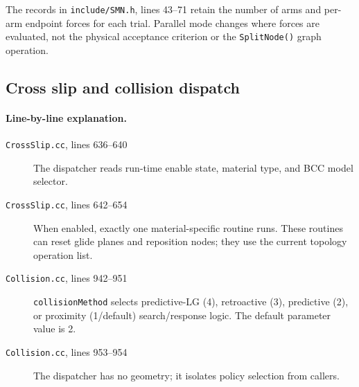 \documentclass[11pt]{article}
\newcommand{\code}[1]{\texorpdfstring{\nolinkurl{#1}}{#1}}
\newcommand{\srcfile}[1]{\texorpdfstring{\nolinkurl{#1}}{#1}}
\begin{document}
The records in \srcfile{include/SMN.h}, lines 43--71 retain the number of
arms and per-arm endpoint forces for each trial. Parallel mode changes where
forces are evaluated, not the physical acceptance criterion or the
\code{SplitNode()} graph operation.

\subsection{Cross slip and collision dispatch}





\paragraph{Line-by-line explanation.}
\begin{description}
\item[\srcfile{CrossSlip.cc}, lines 636--640] The dispatcher reads run-time
enable state, material type, and BCC model selector.
\item[\srcfile{CrossSlip.cc}, lines 642--654] When enabled, exactly one
material-specific routine runs. These routines can reset glide planes and
reposition nodes; they use the current topology operation list.
\item[\srcfile{Collision.cc}, lines 942--951] \code{collisionMethod} selects
predictive-LG (4), retroactive (3), predictive (2), or proximity (1/default)
search/response logic. The default parameter value is 2.
\item[\srcfile{Collision.cc}, lines 953--954] The dispatcher has no geometry;
it isolates policy selection from callers.
\end{description}


\end{document}
